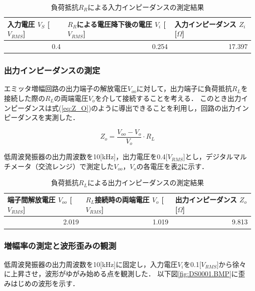 \documentclass[dvipdfmx,titlepage,a4j]{jsarticle}  %
\numberwithin{equation}{section}
\begin{document}
\begin{table}[H]
  \caption{負荷抵抗$R_R$による入力インピーダンスの測定結果}
  \begin{center}
    \begin{tabular}{l|l|l}
      \hline
      入力電圧 $V_S$ [$V_{RMS}$] & $R_R$による電圧降下後の電圧 $V_i$ [$V_{RMS}$] & 入力インピーダンス $Z_i$ [$\Omega$] \\ \hline\hline
      \multicolumn{1}{r|}{0.4}   & \multicolumn{1}{r|}{0.254}                    & \multicolumn{1}{r}{17.397}          \\ \hline
    \end{tabular}
  \end{center}
  \label{tbl:res;Z_I}
\end{table}


\subsubsection{出力インピーダンスの測定}
エミッタ増幅回路の出力端子の解放電圧$V_{oo}$に対して，出力端子に負荷抵抗$R_L$を接続した際の$R_L$の両端電圧$V_o$を介して接続することを考える．
このとき出力インピーダンスは式(\ref{eq:Z_O})のように導出できることを利用し，回路の出力インピーダンスを実測した．

\begin{equation}
  Z_o = \frac{V_{oo} - V_o}{V_o} \cdot R_L
  \label{eq:Z_O}
\end{equation}

低周波発振器の出力周波数を10[kHz]，出力電圧を0.4[$V_{RMS}$]とし，デジタルマルチメータ（交流レンジ）で測定した$V_{oo}$，$V_o$の各電圧を表\ref{tbl:res;Z_O}に示す．

\begin{table}[H]
  \caption{負荷抵抗$R_L$による出力インピーダンスの測定結果}
  \begin{center}
    \begin{tabular}{l|l|l}
      \hline
      端子間解放電圧 $V_{oo}$ [$V_{RMS}$] & $R_L$接続時の両端電圧 $V_o$ [$V_{RMS}$] & 出力インピーダンス $Z_o$ [$\Omega$] \\ \hline\hline
      \multicolumn{1}{r|}{2.019}          & \multicolumn{1}{r|}{1.019}              & \multicolumn{1}{r}{9.813}           \\ \hline
    \end{tabular}
  \end{center}
  \label{tbl:res;Z_O}
\end{table}

\subsubsection{増幅率の測定と波形歪みの観測}
低周波発振器の出力周波数を10[kHz]に固定し，入力電圧$V_i$を0.1[$V_{RMS}$]から徐々に上昇させ，波形がゆがみ始める点を観測した．
以下図\ref{fig:DS0001.BMP}に歪みはじめの波形を示す．
\end{document}
